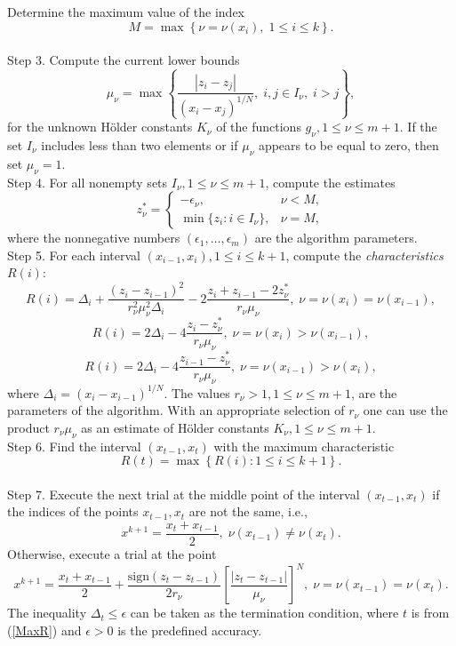 \documentclass[review]{elsarticle}
\begin{document}
	Determine the maximum value of the index 
$$
	M=\max\left\{\nu=\nu(x_i), \; 1 \leq i \leq k \right \}.
$$ \\
Step 3. Compute the current lower bounds
\begin{equation}\label{current_lower_bounds}
	\mu_{\nu} = \max\left\{ \frac{\left|z_i-z_j\right|}{ (x_i - x_j)^{1/N} }, \; i,j \in I_\nu, \; i>j \right\},
\end{equation}
for the unknown H\"{o}lder constants $K_{\nu}$ of the functions $g_{\nu}, 1 \leq \nu \leq m+1$. If the set $I_{\nu}$ includes less than two elements or if $\mu_{\nu}$ appears to be equal to zero, then set $\mu_{\nu}=1$. \\
Step 4. For all nonempty sets $I_{\nu}, 1 \leq \nu \leq m+1$, compute the estimates
\begin{equation}\label{z_estimates}
	z_\nu^\ast = \left\{
   \begin{array}{lr}
     -\epsilon_\nu, & \nu < M,\\
     \min\{ z_i: i\in I_\nu \}, & \nu = M,
   \end{array}
	\right.
\end{equation}
where the nonnegative numbers $(\epsilon_1,\ldots,\epsilon_m )$ are the algorithm parameters. \\
Step 5. For each interval $(x_{i-1}, x_i), 1 \leq i \leq k+1$, compute the \textit{characteristics} $R(i)$:
\begin{equation}\label{R_1}
	R(i)=\Delta_i+\frac{(z_i-z_{i-1})^2}{r_\nu^2 \mu_\nu^2\Delta_i}-2\frac{z_i+z_{i-1}-2z_\nu^\ast}{r_\nu \mu_\nu}, \;  \nu=\nu(x_i)=\nu(x_{i-1}),
\end{equation}
\begin{equation}\label{R_2}
	R(i)=2\Delta_i-4\frac{z_i-z_\nu^\ast}{r_\nu \mu_\nu}, \; \nu=\nu(x_i)>\nu(x_{i-1}),
\end{equation}
\begin{equation}\label{R_3}
R(i)=2\Delta_i-4\frac{z_{i-1}-z_\nu^\ast}{r_\nu \mu_\nu}, \; \nu=\nu(x_{i-1})>\nu(x_i),
\end{equation}
where $\Delta_i=(x_i-x_{i-1})^{1/N}$. The values $r_{\nu} > 1, 1 \leq \nu \leq m+1$, are the parameters of the algorithm. With an appropriate selection of $r_{\nu}$ one can use the product $r_{\nu}\mu_{\nu}$ as an estimate of H\"{o}lder constants $K_{\nu}, 1 \leq \nu \leq m+1$. \\
Step 6. Find the interval $(x_{t-1}, x_t)$ with the maximum characteristic
\begin{equation}\label{MaxR}
	R(t)=\max{\left\{R(i): 1 \leq i \leq k+1\right\}}.
\end{equation} \\
Step 7. Execute the next trial at the middle point of the interval $(x_{t-1}, x_t)$ if the indices of the points $x_{t-1}, x_t$ are not the same, i.e.,
$$
	x^{k+1} = \frac{x_t + x_{t-1}}{2}, \; \nu(x_{t-1}) \neq \nu(x_t).
$$
Otherwise, execute a trial at the point
$$
	x^{k+1} = \frac{x_t+x_{t-1}}{2} + \frac{\mathrm{sign}(z_t-z_{t-1})}{2r_\nu}\left[\frac{\left|z_t-z_{t-1}\right|}{\mu_\nu}\right]^N, \; \nu=\nu(x_{t-1})=\nu(x_t).
$$
The inequality $\Delta_t \leq \epsilon$ can be taken as the termination condition, where $t$ is from (\ref{MaxR}) and $\epsilon>0$ is the predefined accuracy.
\end{document}
